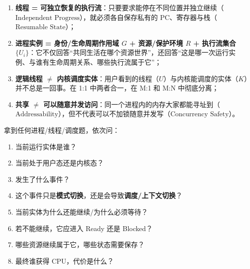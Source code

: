 \documentclass[11pt,a4paper]{ctexart}
\newcommand{\kw}[1]{\textbf{#1}}
\begin{document}
\begin{center}
\endgroup
\end{center}

\begin{corebox}[理解线程的四句核心硬道理]
\begin{enumerate}
  \item \kw{线程 = 可独立恢复的执行流}：只要要求能停在不同位置并独立继续（$\text{Independent Progress}$），就必须各自保存私有的 PC、寄存器与栈（$\text{Resumable State}$）；
  \item \kw{进程实例 = 身份/生命周期作用域 $G$ + 资源/保护环境 $R$ + 执行流集合 $\{U_i\}$}：它不仅回答“共同生活在哪个资源世界”，还回答“这是哪一次运行实例、与谁有生命周期关系、哪些执行流属于它”；
  \item \kw{逻辑线程 $\neq$ 内核调度实体}：用户看到的线程（$U$）与内核能调度的实体（$K$）并不总是一回事。在 1:1 中两者合一，在 M:1 和 M:N 中彻底分离；
  \item \kw{共享 $\neq$ 可以随意并发访问}：同一个进程内的内存大家都能寻址到（$\text{Addressability}$），但不代表可以不加锁随意并发写（$\text{Concurrency Safety}$）。
\end{enumerate}
\end{corebox}

\begin{method}[进程与调度八问]
拿到任何进程/线程/调度题，依次问：
\begin{enumerate}
\item 当前运行实体是谁？
\item 当前处于用户态还是内核态？
\item 发生了什么事件？
\item 这个事件只是\kw{模式切换}，还是会导致\kw{调度/上下文切换}？
\item 当前实体为什么还能继续/为什么必须等待？
\item 若不能继续，它应进入 Ready 还是 Blocked？
\item 哪些资源继续属于它，哪些状态需要保存？
\item 最终谁获得 CPU，代价是什么？
\end{enumerate}
\end{method}
\end{document}
